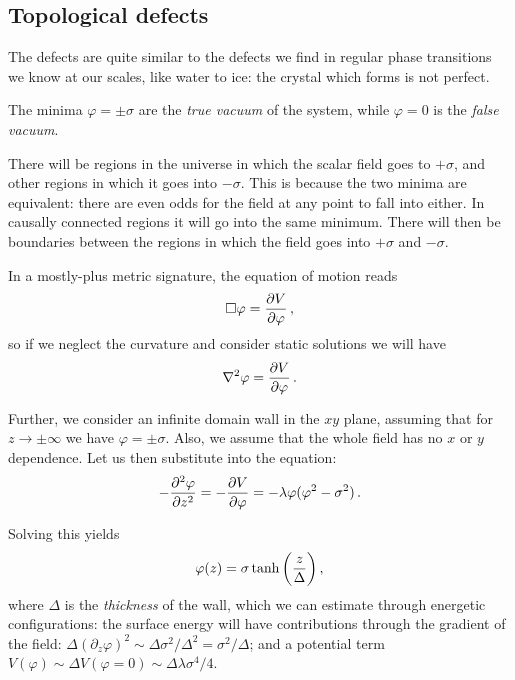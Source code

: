 \documentclass[main.tex]{subfiles}
\begin{document}
\subsection{Topological defects}

The defects are quite similar to the defects we find in regular phase transitions we know at our scales, like water to ice: the crystal which forms is not perfect. 

The minima \(\varphi = \pm \sigma \) are the \emph{true vacuum} of the system, while \(\varphi = 0\) is the \emph{false vacuum}. 

There will be regions in the universe in which the scalar field goes to \(+ \sigma \), and other regions in which it goes into \(- \sigma \). 
This is because the two minima are equivalent: there are even odds for the field at any point to fall into either. In causally connected regions it will go into the same minimum. 
There will then be boundaries between the regions in which the field goes into \(+ \sigma \) and \(- \sigma \).

In a mostly-plus metric signature, the equation of motion reads 
%
\begin{align}
\square \varphi = \pdv{V}{\varphi }
\,,
\end{align}
%
so if we neglect the curvature and consider static solutions we will have 
%
\begin{align}
\nabla^2 \varphi = \pdv{V}{\varphi }
\,.
\end{align}

Further, we consider an infinite domain wall in the \(xy\) plane, assuming that for \(z \to \pm \infty \) we have \(\varphi = \pm \sigma \). Also, we assume that the whole field has no \(x\) or \(y\) dependence.  
Let us then substitute into the equation: 
%
\begin{align}
- \pdv[2]{\varphi }{z} = - \pdv{V}{\varphi } = - \lambda \varphi (\varphi^2 - \sigma^2)
\,.
\end{align}

Solving this yields 
%
\begin{align}
\varphi (z) = \sigma \tanh \qty( \frac{z}{\Delta })
\,,
\end{align}
%
where \(\Delta \) is the \emph{thickness} of the wall, which we can estimate through energetic configurations: the surface energy will have contributions through the gradient of the field: \( \Delta (\partial_{z} \varphi)^2 \sim \Delta \sigma^2 / \Delta^2 = \sigma^2 / \Delta  \); and a potential term \(V(\varphi ) \sim \Delta V(\varphi =0) \sim \Delta \lambda \sigma^{4} / 4\). 
\end{document}

